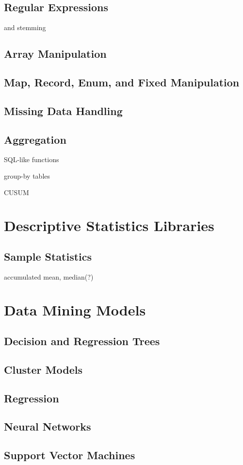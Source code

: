 \documentclass{article}
\begin{document}
\subsection{Regular Expressions}

and stemming

\subsection{Array Manipulation}

\subsection{Map, Record, Enum, and Fixed Manipulation}

\subsection{Missing Data Handling}

\subsection{Aggregation}

SQL-like functions

group-by tables

CUSUM

\pagebreak

\section{Descriptive Statistics Libraries}

\subsection{Sample Statistics}

accumulated mean, median(?)

\pagebreak

\section{Data Mining Models}

\subsection{Decision and Regression Trees}

\subsection{Cluster Models}

\subsection{Regression}

\subsection{Neural Networks}

\subsection{Support Vector Machines}
\end{document}
